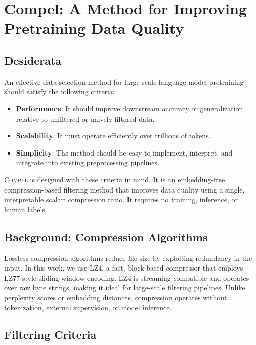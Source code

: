 \section{Compel: A Method for Improving Pretraining Data Quality}\label{sec:method}

\subsection{Desiderata}\label{sec:desiderata}

An effective data selection method for large-scale language model pretraining should satisfy the following criteria:
\begin{itemize}[leftmargin=1.35em,topsep=2pt,itemsep=1pt]
\item \textbf{Performance}: It should improve downstream accuracy or generalization relative to unfiltered or naively filtered data.
\item \textbf{Scalability}: It must operate efficiently over trillions of tokens.
\item \textbf{Simplicity}: The method should be easy to implement, interpret, and integrate into existing preprocessing pipelines.
\end{itemize}

\textsc{Compel} is designed with these criteria in mind.
It is an embedding-free, compression-based filtering method that improves data quality using a single, interpretable scalar: compression ratio.
It requires no training, inference, or human labels.

\subsection{Background: Compression Algorithms}\label{sec:background}

Lossless compression algorithms reduce file size by exploiting redundancy in the input.
In this work, we use LZ4, a fast, block-based compressor that employs LZ77-style sliding-window encoding.
LZ4 is streaming-compatible and operates over raw byte strings, making it ideal for large-scale filtering pipelines.
Unlike perplexity scores or embedding distances, compression operates without tokenization, external supervision, or model inference.

\subsection{Filtering Criteria}\label{sec:filtering}

